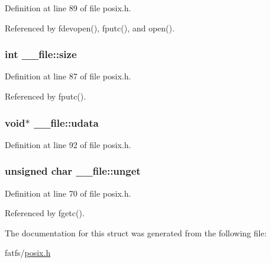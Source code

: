 Definition at line 89 of file posix.\-h.



Referenced by fdevopen(), fputc(), and open().

\hypertarget{struct____file_aff4a1ca8b6a12460812928afae81248d}{
\subsubsection[{size}]{\setlength{\rightskip}{0pt plus 5cm}int \-\_\-\-\_\-file\-::size}}\label{struct____file_aff4a1ca8b6a12460812928afae81248d}


Definition at line 87 of file posix.\-h.



Referenced by fputc().

\hypertarget{struct____file_abe6f3bdb4df4119277132eb3e13a4628}{
\subsubsection[{udata}]{\setlength{\rightskip}{0pt plus 5cm}void$\ast$ \-\_\-\-\_\-file\-::udata}}\label{struct____file_abe6f3bdb4df4119277132eb3e13a4628}


Definition at line 92 of file posix.\-h.

\hypertarget{struct____file_a1d139ae3cb11a1fada469a49f7d3d3b6}{
\subsubsection[{unget}]{\setlength{\rightskip}{0pt plus 5cm}unsigned char \-\_\-\-\_\-file\-::unget}}\label{struct____file_a1d139ae3cb11a1fada469a49f7d3d3b6}


Definition at line 70 of file posix.\-h.



Referenced by fgetc().



The documentation for this struct was generated from the following file\-:\begin{DoxyCompactItemize}
\item 
fatfs/\hyperlink{posix_8h}{posix.\-h}\end{DoxyCompactItemize}
